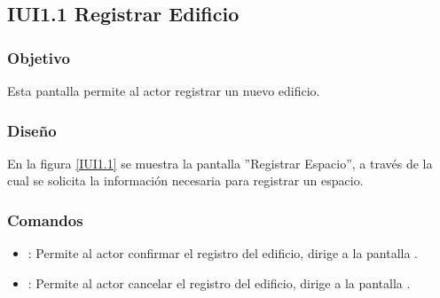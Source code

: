 \subsection{IUI1.1 Registrar Edificio}

\subsubsection{Objetivo}
	Esta pantalla permite al actor registrar un nuevo edificio.

\subsubsection{Diseño}

    En la figura \ref{IUI1.1} se muestra la pantalla ''Registrar Espacio'', a través de la cual se solicita la información necesaria para registrar un espacio.
 

\subsubsection{Comandos}
    \begin{itemize}
	\item {}: Permite al actor confirmar el registro del edificio, dirige a la pantalla .
	
	\item {}: Permite al actor cancelar el registro del edificio, dirige a la pantalla .
    \end{itemize}

